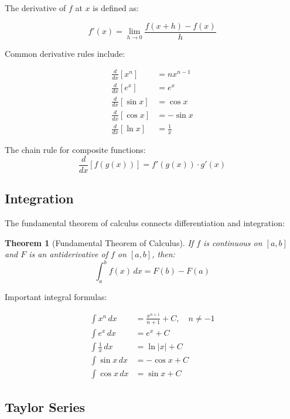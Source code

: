 \documentclass[11pt]{article}
\newtheorem{theorem}{Theorem}
\begin{document}
The derivative of $f$ at $x$ is defined as:

\begin{equation}
  f'(x) = \lim_{h \to 0} \frac{f(x+h) - f(x)}{h}
  \label{eq:derivative}
\end{equation}

Common derivative rules include:

\begin{align}
  \frac{d}{dx}[x^n] &= nx^{n-1} \label{eq:power} \\
  \frac{d}{dx}[e^x] &= e^x \label{eq:exp} \\
  \frac{d}{dx}[\sin x] &= \cos x \label{eq:sin} \\
  \frac{d}{dx}[\cos x] &= -\sin x \label{eq:cos} \\
  \frac{d}{dx}[\ln x] &= \frac{1}{x} \label{eq:ln}
\end{align}

The chain rule for composite functions:
\begin{equation}
  \frac{d}{dx}[f(g(x))] = f'(g(x)) \cdot g'(x)
  \label{eq:chain}
\end{equation}

\subsection{Integration}

The fundamental theorem of calculus connects differentiation and integration:

\begin{theorem}[Fundamental Theorem of Calculus]
If $f$ is continuous on $[a,b]$ and $F$ is an antiderivative of $f$ on $[a,b]$, then:
\begin{equation}
  \int_a^b f(x)\,dx = F(b) - F(a)
  \label{eq:ftc}
\end{equation}
\end{theorem}

Important integral formulas:

\begin{align}
  \int x^n\,dx &= \frac{x^{n+1}}{n+1} + C, \quad n \neq -1 \\
  \int e^x\,dx &= e^x + C \\
  \int \frac{1}{x}\,dx &= \ln|x| + C \\
  \int \sin x\,dx &= -\cos x + C \\
  \int \cos x\,dx &= \sin x + C
\end{align}

\subsection{Taylor Series}
\end{document}
